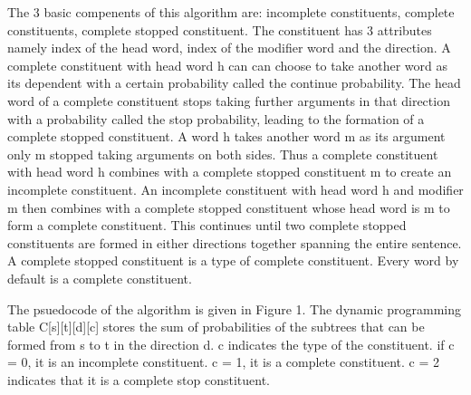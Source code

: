 \documentclass{article}
\begin{document}
The 3 basic compenents of this algorithm are: incomplete constituents, complete constituents, complete stopped constituent. The constituent has  3 attributes namely index of the head word, index of the modifier word and the direction. A complete constituent with head word h can can choose to take another word as its dependent with a certain probability called the continue probability. The head word of a complete constituent stops taking further arguments in that direction with a probability called the stop probability, leading to the formation of a complete stopped constituent. A word h takes another word m as its argument only m stopped taking arguments on both sides. Thus a complete constituent with head word h combines with a complete stopped constituent m to create an incomplete constituent. An incomplete constituent with head word h and modifier m then combines with a complete stopped constituent whose head word is m to form a complete constituent. This continues until two complete stopped constituents are formed in either directions together spanning the entire sentence. A complete stopped constituent is a type of complete constituent. Every word by default is a complete constituent.

The psuedocode of the algorithm is given in Figure 1. The dynamic programming table C[s][t][d][c] stores the sum of probabilities of the subtrees that can be formed from s to t in the direction d. c indicates the type of the constituent. if c = 0, it is an incomplete constituent. c = 1, it is a complete constituent. c = 2 indicates that it is a complete stop constituent.
\end{document}
